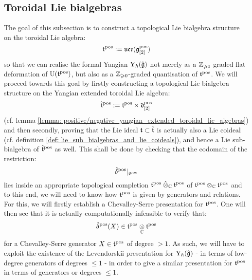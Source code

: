     \subsection{Toroidal Lie bialgebras} \label{subsection: toroidal_lie_bialgebras}
        The goal of this subsection is to construct a topological Lie bialgebra structure on the toroidal Lie algebra:
            $$\mathfrak{t}^{\mathrm{pos}} := \mathfrak{uce}(\mathfrak{g}_{[2]}^{\mathrm{pos}})$$
        so that we can realise the formal Yangian $\mathrm{Y}_{\hbar}(\hat{\mathfrak{g}})$ not merely as a $\mathbb{Z}_{\geqslant 0}$-graded flat deformation of $\mathrm{U}(\mathfrak{t}^{\mathrm{pos}})$, but also as a $\mathbb{Z}_{\geqslant 0}$-graded quantisation of $\mathfrak{t}^{\mathrm{pos}}$. We will proceed towards this goal by firstly constructing a topological Lie bialgebra structure on the Yangian extended toroidal Lie algebra:
            $$\hat{\mathfrak{t}}^{\mathrm{pos}} := \mathfrak{t}^{\mathrm{pos}} \rtimes \mathfrak{d}_{[2]}^{\mathrm{pos}}$$
        (cf. lemma \ref{lemma: positive/negative_yangian_extended_toroidal_lie_algebras}) and then secondly, proving that the Lie ideal $\mathfrak{t} \subset \hat{\mathfrak{t}}$ is actually also a Lie coideal (cf. definition \ref{def: lie_sub_bialgebras_and_lie_coideals}), and hence a Lie sub-bialgebra of $\hat{\mathfrak{t}}^{\mathrm{pos}}$ as well. This shall be done by checking that the codomain of the restriction:
            $$\hat{\delta}^{\mathrm{pos}}|_{\mathfrak{t}^{\mathrm{pos}}}$$
        lies inside an appropriate topological completion $\toroidal^{\positive} \hattensor_{\bbC} \toroidal^{\positive}$ of $\toroidal^{\positive} \tensor_{\bbC} \toroidal^{\positive}$ and to this end, we will need to know how $\mathfrak{t}^{\mathrm{pos}}$ is given by generators and relations. For this, we will firstly establish a Chevalley-Serre presentation for $\mathfrak{t}^{\mathrm{pos}}$. One will then see that it is actually computationally infeasible to verify that:
            $$\hat{\delta}^{\positive}(X) \in \toroidal^{\positive} \tensor_{\bbC} \toroidal^{\positive}$$
        for a Chevalley-Serre generator $X \in \mathfrak{t}^{\mathrm{pos}}$ of degree $> 1$. As such, we will have to exploit the existence of the Levendorskii presentation for $\mathrm{Y}_{\hbar}(\hat{\mathfrak{g}})$ - in terms of low-degree generators of degrees $\leq 1$ - in order to give a similar presentation for $\mathfrak{t}^{\mathrm{pos}}$ in terms of generators or degrees $\leq 1$.

